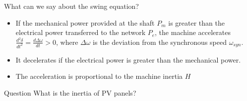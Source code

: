 \begin{frame}{What can we say about the swing equation?}
\begin{itemize}
    \item If the mechanical power provided at the shaft $P_m$ is greater than the electrical power transferred to the network $P_e$, the machine accelerates $\frac{d^2\delta}{dt^2} = \frac{d\Delta\omega}{dt} > 0$, where $\Delta\omega$ is the deviation from the synchronous speed $\omega_{syn}$.
    \item It decelerates if the electrical power is greater than the mechanical power.
    \item The acceleration is proportional to the machine inertia $H$
\end{itemize}
\begin{block}{Question}
    {What is the inertia of PV panels?}
\end{block}
\end{frame}




